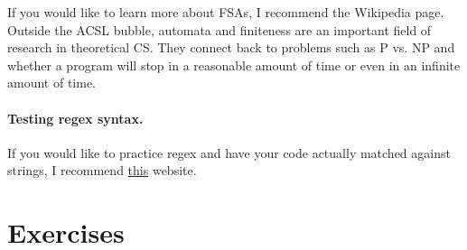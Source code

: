 \documentclass[10pt]{article}
\begin{document}
{\centering
{}

}

If you would like to learn more about FSAs, I recommend the Wikipedia page.
Outside the ACSL bubble, automata and finiteness
are an important field of research in theoretical CS\@.
They connect back to problems such as P vs. NP and whether a program
will stop in a reasonable amount of time or even in an infinite amount of time.

\paragraph{Testing regex syntax.}
If you would like to practice regex and have your code actually
matched against strings, I recommend \href{https://regexr.com/}{this} website.

\section{Exercises}
\end{document}
